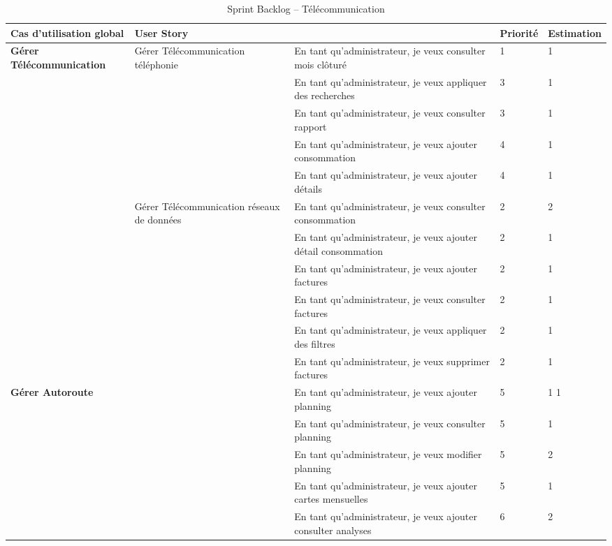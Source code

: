 \documentclass[a4paper,11pt]{report}
\begin{document}
\begin{table}[H]
\centering
\renewcommand{\arraystretch}{1.5}
\setlength{\tabcolsep}{4pt}
\begin{tabular}{|m{3.2cm}|m{3cm}|m{5.8cm}|m{1cm}|m{1cm}|}
\hline
\textbf{Cas d’utilisation global} & \textbf{User Story} & \textbf{} & \textbf{Priorité} & \textbf{Estimation} \\
\hline
\multirow{8}{=}{\textbf{Gérer Télécommunication}} 
& \multirow{5}{=}{Gérer Télécommunication téléphonie} 
& En tant qu’administrateur, je veux consulter mois clôturé & 1 & 1 \\
\cline{3-5}
& & En tant qu’administrateur, je veux appliquer des recherches & 3 & 1 \\
\cline{3-5}
& & En tant qu’administrateur, je veux consulter rapport & 3 & 1 \\
\cline{3-5}
& & En tant qu’administrateur, je veux ajouter consommation & 4 & 1 \\
\cline{3-5}
& & En tant qu’administrateur, je veux ajouter détails & 4&1 \\
\cline{2-5}
& \multirow{2}{=}{Gérer Télécommunication réseaux de données} 
& En tant qu’administrateur, je veux consulter consommation & 2 & 2 \\
\cline{3-5}
& & En tant qu’administrateur, je veux ajouter détail consommation & 2&1 \\
\hline
\multirow{5}{=}{\textbf{Gérer facturation}} 
& \multicolumn{1}{l|}{} & En tant qu’administrateur, je veux ajouter factures & 2&1 \\
\cline{3-5}
& \multicolumn{1}{l|}{} & En tant qu’administrateur, je veux consulter factures &2 &1 \\
\cline{3-5}
& \multicolumn{1}{l|}{} & En tant qu’administrateur, je veux appliquer des filtres &2 & 1 \\
\cline{3-5}
& \multicolumn{1}{l|}{} & En tant qu’administrateur, je veux supprimer factures & 2&1 \\
\hline
\multirow{5}{=}{\textbf{Gérer Autoroute}} 
& \multicolumn{1}{l|}{} & En tant qu’administrateur, je veux ajouter planning & 5 &1 1 \\
\cline{3-5}
& \multicolumn{1}{l|}{} & En tant qu’administrateur, je veux consulter planning & 5&1 \\
\cline{3-5}
& \multicolumn{1}{l|}{} & En tant qu’administrateur, je veux modifier planning & 5&2 \\
\cline{3-5}
& \multicolumn{1}{l|}{} & En tant qu’administrateur, je veux ajouter cartes mensuelles & 5&1 \\
\cline{3-5}
& \multicolumn{1}{l|}{} & En tant qu’administrateur, je veux ajouter consulter analyses & 6&2 \\
\hline
\end{tabular}
\caption{Sprint Backlog – Télécommunication}
\end{table}
\end{document}
